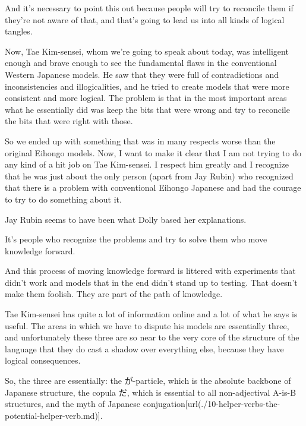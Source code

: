 {}

And it's necessary to point this out because people will try to reconcile them if they're not aware of that, and that's going to lead us into all kinds of logical tangles.

Now, Tae Kim-sensei, whom we're going to speak about today, was intelligent enough and brave enough to see the fundamental flaws in the conventional Western Japanese models. He saw that they were full of contradictions and inconsistencies and illogicalities, and he tried to create models that were more consistent and more logical. The problem is that in the most important areas what he essentially did was keep the bits that were wrong and try to reconcile the bits that were right with those.

So we ended up with something that was in many respects worse than the original Eihongo models. Now, I want to make it clear that I am not trying to do any kind of a hit job on Tae Kim-sensei. I respect him greatly and I recognize that he was just about the only person (apart from Jay Rubin) who recognized that there is a problem with conventional Eihongo Japanese and had the courage to try to do something about it.

{}

Jay Rubin seems to have been what Dolly based her explanations.

It's people who recognize the problems and try to solve them who move knowledge forward.

And this process of moving knowledge forward is littered with experiments that didn't work and models that in the end didn't stand up to testing. That doesn't make them foolish. They are part of the path of knowledge.

\startsectionlevel[title={Tae Kim},reference={tae-kim}]

Tae Kim-sensei has quite a lot of information online and a lot of what he says is useful. The areas in which we have to dispute his models are essentially three, and unfortunately these three are so near to the very core of the structure of the language that they do cast a shadow over everything else, because they have logical consequences.

So, the three are essentially:\crlf
the が-particle, which is the absolute backbone of Japanese structure,\crlf
the copula だ, which is essential to all non-adjectival A-is-B structures, and the myth of Japanese conjugation\goto{{[}10{]}}[url(./10-helper-verbs-the-potential-helper-verb.md)].

